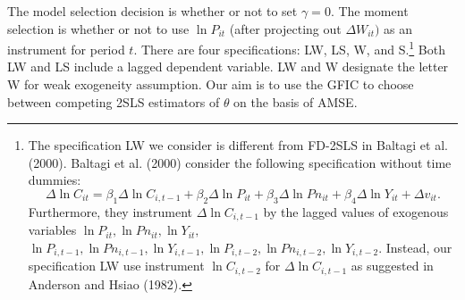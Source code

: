 The model selection decision is whether or not to set $\gamma = 0$. The moment selection is whether or not to use $\ln P_{it}$ (after projecting out $\Delta W_{it})$ as an instrument for period $t$.  There are four specifications:  LW, LS, W, and S.\footnote{The specification LW we consider is different from FD-2SLS in Baltagi et al. (2000). Baltagi et al. (2000) consider the following specification without time dummies:
 \[
\Delta \ln C_{it} = \beta_1 \Delta \ln C_{i,t-1} +  \beta_2 \Delta \ln P_{it} +\beta_3 \Delta \ln Pn_{it} +  \beta_4 \Delta \ln Y_{it} + \Delta v_{it}.
\]
Furthermore, they instrument $\Delta \ln C_{i,t-1}$ by the lagged values of exogenous variables $\ln P_{it}, \ln Pn_{it}, \ln Y_{it},$ $\ln P_{i,t-1}, \ln Pn_{i,t-1}, \ln Y_{i,t-1}, \ln P_{i,t-2}, \ln Pn_{i,t-2}, \ln Y_{i,t-2}$. Instead, our specification LW use instrument $\ln C_{i, t-2}$ for $\Delta \ln C_{i,t-1}$ as suggested in Anderson and Hsiao (1982).}
 Both LW and LS include a lagged dependent variable. LW and W designate the letter W for weak exogeneity assumption. Our aim is to use the GFIC to choose between competing 2SLS estimators of $\theta$ on the basis of AMSE. 

